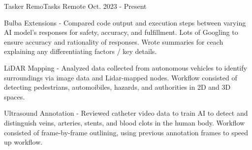 

\begin{cventries}

  \cventry
    {Tasker} %
    {RemoTasks} %
    {Remote} %
    {Oct. 2023 - Present} %
    {
      \begin{cvitems} %
		  \item {Bulba Extensions - Compared code output and execution steps between varying AI model's responses for safety, accuracy, and fulfillment. Lots of Googling to ensure accuracy and rationality of responses. Wrote summaries for ceach explaining any differentiating factors / key details.}
		  \item {LiDAR Mapping - Analyzed data collected from autonomous vehicles to identify surroundings via image data and Lidar-mapped nodes. Workflow consisted of detecting pedestrians, automoibiles, hazards, and authorities in 2D and 3D spaces.}
		  \item {Ultrasound Annotation - Reviewed catheter video data to train AI to detect and distinguish veins, arteries, stents, and blood clots in the human body. Workflow consisted of frame-by-frame outlining, using previous annotation frames to speed up workflow.}
      \end{cvitems}
    }

\end{cventries}
